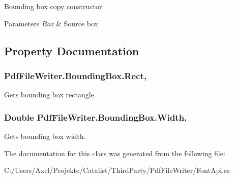 Bounding box copy constructor 


\begin{DoxyParams}{Parameters}
{\em Box} & Source box\\
\hline
\end{DoxyParams}


\subsection{Property Documentation}
\subsubsection[{\texorpdfstring{Rect}{Rect}}]{ Pdf\+File\+Writer.\+Bounding\+Box.\+Rect\hspace{0.3cm}{\ttfamily [get]}, {\ttfamily [set]}}\hypertarget{class_pdf_file_writer_1_1_bounding_box_a036208c82679b4fcefec138fb38fab87}{}\label{class_pdf_file_writer_1_1_bounding_box_a036208c82679b4fcefec138fb38fab87}


Gets bounding box rectangle. 

\subsubsection[{\texorpdfstring{Width}{Width}}]{\setlength{\rightskip}{0pt plus 5cm}Double Pdf\+File\+Writer.\+Bounding\+Box.\+Width\hspace{0.3cm}{\ttfamily [get]}, {\ttfamily [set]}}\hypertarget{class_pdf_file_writer_1_1_bounding_box_a7443efb71fa3975c1b106b32b48db4c7}{}\label{class_pdf_file_writer_1_1_bounding_box_a7443efb71fa3975c1b106b32b48db4c7}


Gets bounding box width. 



The documentation for this class was generated from the following file\+:\begin{DoxyCompactItemize}
\item 
C\+:/\+Users/\+Axel/\+Projekte/\+Catalist/\+Third\+Party/\+Pdf\+File\+Writer/Font\+Api.\+cs\end{DoxyCompactItemize}
